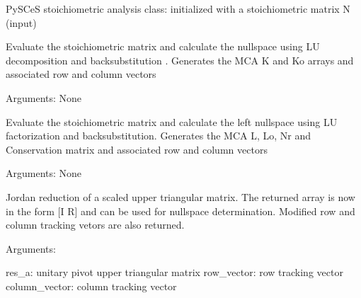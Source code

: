 \documentclass[a4paper,11pt,english]{sphinxmanual}
\begin{document}
\begin{fulllineitems}
\label{modules_doc:cbmpy.PyscesStoich.Stoich}
PySCeS stoichiometric analysis class: initialized with a stoichiometric matrix N (input)

\begin{fulllineitems}
\label{modules_doc:cbmpy.PyscesStoich.Stoich.AnalyseK}
Evaluate the stoichiometric matrix and calculate the nullspace using LU decomposition and backsubstitution .
Generates the MCA K and Ko arrays and associated row and column vectors

Arguments:
None

\end{fulllineitems}


\begin{fulllineitems}
\label{modules_doc:cbmpy.PyscesStoich.Stoich.AnalyseL}
Evaluate the stoichiometric matrix and calculate the left nullspace using LU factorization and backsubstitution.
Generates the MCA L, Lo, Nr and Conservation matrix and associated row and column vectors

Arguments:
None

\end{fulllineitems}


\begin{fulllineitems}
\label{modules_doc:cbmpy.PyscesStoich.Stoich.BackSubstitution}
Jordan reduction of a scaled upper triangular matrix. The returned array is now in the form {[}I R{]} and can
be used for nullspace determination. Modified row and column tracking vetors are also returned.

Arguments:

res\_a: unitary pivot upper triangular matrix
row\_vector: row tracking vector
column\_vector: column tracking vector

\end{fulllineitems}



\end{fulllineitems}
\end{document}
